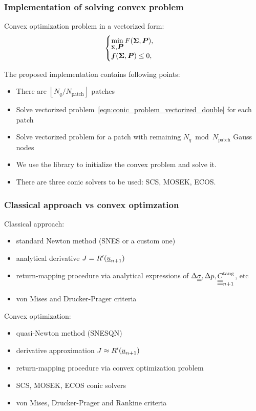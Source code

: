 \documentclass[9pt]{beamer}
\begin{document}
\begin{frame}[fragile]
  \frametitle{Implementation of solving convex problem}

  Convex optimization problem in a vectorized form:
  \begin{equation}
    \label{eqn:conic_problem_vectorized_double}
    \begin{cases}
        \min\limits_{\bm{\Sigma}, \mbox{\boldmath $P$}} F(\bm{\Sigma}, \mbox{\boldmath $P$}), \\
        \mbox{\boldmath $f$}(\bm{\Sigma}, \mbox{\boldmath $P$}) \leq 0,
    \end{cases}
  \end{equation}

  The proposed implementation contains following points:
  \begin{itemize}
    \item There are $\left\lfloor N_q / N_\text{patch} \right\rfloor $ patches 
    \item Solve vectorized problem~\eqref{eqn:conic_problem_vectorized_double} for each patch
    \item Solve vectorized problem for a patch with remaining $N_q \bmod N_\text{patch}$ Gauss nodes 
    \item We use the  library to initialize the convex problem and solve it.
    \item There are three conic solvers to be used: SCS, MOSEK, ECOS.
  \end{itemize}

\end{frame}

\begin{frame}
  \frametitle{Classical approach vs convex optimzation}

  Classical approach:
  \begin{itemize}
    \item standard Newton method (SNES or a custom one)
    \item analytical derivative $J = R^\prime(\underline{u}_{n+1})$
    \item return-mapping procedure via analytical expressions of $\Delta\underline{\underline{\sigma}}, \Delta p, \underline{\underline{\underline{\underline{C_{}}}}}^\text{tang}_{n+1}$, etc
    \item von Mises and Drucker-Prager criteria
  \end{itemize}
  
  Convex optimization:
  \begin{itemize}
    \item quasi-Newton method (SNESQN)
    \item derivative approximation $J \approx R^\prime(\underline{u}_{n+1})$
    \item return-mapping procedure via convex optimization problem
    \item SCS, MOSEK, ECOS conic solvers 
    \item von Mises, Drucker-Prager and Rankine criteria
  \end{itemize}
\end{frame}
\end{document}
